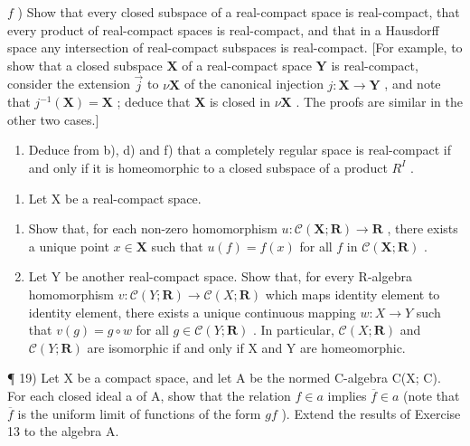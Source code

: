 \(f\) ) Show that every closed subspace of a real-compact space is real-compact, that every product of real-compact spaces is real-compact, and that in a Hausdorff space any intersection of real-compact subspaces is real-compact. {[}For example, to show that a closed subspace \(\mathbf{X}\) of a real-compact space \(\mathbf{Y}\) is real-compact, consider the extension \(\vec{j}\) to \(\nu\mathbf{X}\) of the canonical injection \(j:\mathbf{X}\to\mathbf{Y}\) , and note that \(j^{-1}(\mathbf{X})=\mathbf{X}\) ; deduce that \(\mathbf{X}\) is closed in \(\nu\mathbf{X}\) . The proofs are similar in the other two cases.{]}

\begin{enumerate}
\def\labelenumi{\alph{enumi})}
\setcounter{enumi}{6}
\tightlist
\item
  Deduce from b), d) and f) that a completely regular space is real-compact if and only if it is homeomorphic to a closed subspace of a product \(R^{I}\) .
\end{enumerate}

\begin{enumerate}
\def\labelenumi{\arabic{enumi})}
\setcounter{enumi}{17}
\tightlist
\item
  Let X be a real-compact space.
\end{enumerate}

\begin{enumerate}
\def\labelenumi{\alph{enumi})}
\item
  Show that, for each non-zero homomorphism \(u: \mathcal{C}(\mathbf{X}; \mathbf{R}) \to \mathbf{R}\) , there exists a unique point \(x \in \mathbf{X}\) such that \(u(f) = f(x)\) for all \(f\) in \(\mathcal{C}(\mathbf{X}; \mathbf{R})\) .
\item
  Let Y be another real-compact space. Show that, for every R-algebra homomorphism \(v: \mathcal{C}(Y; \mathbf{R}) \to \mathcal{C}(X; \mathbf{R})\) which maps identity element to identity element, there exists a unique continuous mapping \(w: X \to Y\) such that \(v(g) = g \circ w\) for all \(g \in \mathcal{C}(Y; \mathbf{R})\) . In particular, \(\mathcal{C}(X; \mathbf{R})\) and \(\mathcal{C}(Y; \mathbf{R})\) are isomorphic if and only if X and Y are homeomorphic.
\end{enumerate}

¶ 19) Let X be a compact space, and let A be the normed C-algebra C(X; C). For each closed ideal a of A, show that the relation \(f \in a\) implies \(\overline{f} \in a\) (note that \(\overline{f}\) is the uniform limit of functions of the form \(g f\) ). Extend the results of Exercise 13 to the algebra A.


